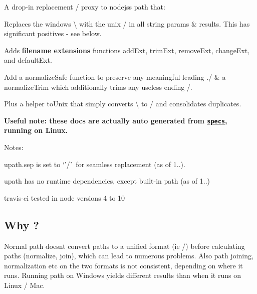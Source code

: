 \href{https://travis-ci.org/anodynos/upath}{\tt } \href{https://david-dm.org/anodynos/upath}{\tt }

A drop-\/in replacement / proxy to nodejs\textquotesingle{}s {\ttfamily path} that\+:


\begin{DoxyItemize}
\item Replaces the windows {\ttfamily \textbackslash{}} with the unix {\ttfamily /} in all string params \& results. This has significant positives -\/ see below.
\item Adds {\bfseries filename extensions} functions {\ttfamily add\+Ext}, {\ttfamily trim\+Ext}, {\ttfamily remove\+Ext}, {\ttfamily change\+Ext}, and {\ttfamily default\+Ext}.
\item Add a {\ttfamily normalize\+Safe} function to preserve any meaningful leading {\ttfamily ./} \& a {\ttfamily normalize\+Trim} which additionally trims any useless ending {\ttfamily /}.
\item Plus a helper {\ttfamily to\+Unix} that simply converts {\ttfamily \textbackslash{}} to {\ttfamily /} and consolidates duplicates.
\end{DoxyItemize}

{\bfseries Useful note\+: these docs are actually auto generated from \href{https://github.com/anodynos/upath/blob/master/source/spec/upath-spec.coffee}{\tt specs}, running on Linux.}

Notes\+:


\begin{DoxyItemize}
\item {\ttfamily upath.\+sep} is set to `'/\textquotesingle{}\`{} for seamless replacement (as of 1..).
\item upath has no runtime dependencies, except built-\/in {\ttfamily path} (as of 1..)
\item travis-\/ci tested in node versions 4 to 10 ~\newline
 \subsection*{Why ?}
\end{DoxyItemize}

Normal {\ttfamily path} doesn\textquotesingle{}t convert paths to a unified format (ie {\ttfamily /}) before calculating paths ({\ttfamily normalize}, {\ttfamily join}), which can lead to numerous problems. Also path joining, normalization etc on the two formats is not consistent, depending on where it runs. Running {\ttfamily path} on Windows yields different results than when it runs on Linux / Mac.


